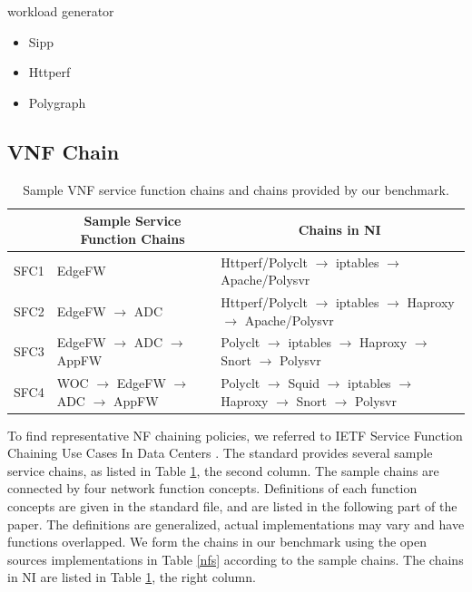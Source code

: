 workload generator
\begin{itemize}
\item{}
Sipp
\item{}
Httperf
\item{}
Polygraph
\end{itemize}

\subsection{VNF Chain}

\begin{table}[!t]
\newcommand{\tabincell}[2]{\begin{tabular}{@{}#1@{}}#2\end{tabular}}
\centering
\begin{tabular}{|l|l|l|}\hline
\textbf{} & \multicolumn{1}{c|}{\textbf{Sample Service Function Chains}} & \multicolumn{1}{c|}{\textbf{Chains in NI}} \\\hline
SFC1 & EdgeFW & Httperf/Polyclt $\to$ iptables $\to$ Apache/Polysvr \\\hline
SFC2 & EdgeFW $\to$ ADC & Httperf/Polyclt $\to$ iptables $\to$ Haproxy $\to$ Apache/Polysvr \\\hline
SFC3 & EdgeFW $\to$ ADC $\to$ AppFW & Polyclt $\to$ iptables $\to$ Haproxy $\to$ Snort $\to$ Polysvr \\\hline
SFC4 & WOC $\to$ EdgeFW $\to$ ADC $\to$ AppFW & Polyclt $\to$  Squid $\to$ iptables $\to$ Haproxy $\to$ Snort $\to$ Polysvr \\\hline
\end{tabular}
\caption{Sample VNF service function chains and chains provided by our benchmark.}
\label{chains}
\end{table}

To find representative NF chaining policies,
we referred to IETF Service Function Chaining Use Cases
In Data Centers \cite{draft-ietf-sfc-dc-use-cases-06}.
The standard provides several sample service chains,
as listed in Table \ref{chains}, the second column.
The sample chains are connected by four network function concepts.
Definitions of each function concepts are given in the standard file,
and are listed in the following part of the paper.
The definitions are generalized,
actual implementations may vary and have functions overlapped.
We form the chains in our benchmark using the open sources
implementations in Table \ref{nfs} according to the sample chains.
The chains in NI are listed in Table \ref{chains}, the right column.


